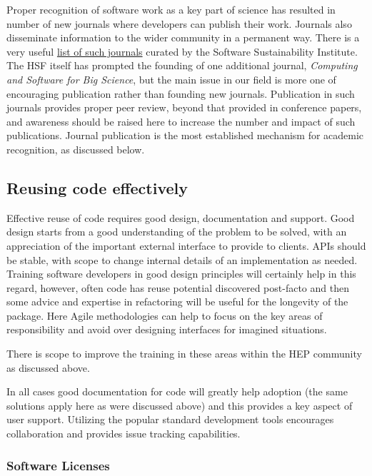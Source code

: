 \documentclass[12pt,a4paper]{article}
\begin{document}
Proper recognition of software work as a key part of science has
resulted in number of new journals where developers can publish their
work. Journals also disseminate information to the wider community in a
permanent way. There is a very useful
\href{https://www.software.ac.uk/which-journals-should-i-publish-my-software}{{list
of such journals}} curated by the Software Sustainability Institute. The
HSF itself has prompted the founding of one additional journal,
\emph{Computing and Software for Big Science}, but the main issue in our
field is more one of encouraging publication rather than founding new
journals. Publication in such journals provides proper peer review,
beyond that provided in conference papers, and awareness should be
raised here to increase the number and impact of such publications.
Journal publication is the most established mechanism for academic
recognition, as discussed below.

\hypertarget{reusing-code-effectively}{%
\subsection{Reusing code effectively}\label{reusing-code-effectively}}

Effective reuse of code requires good design, documentation and support.
Good design starts from a good understanding of the problem to be
solved, with an appreciation of the important external interface to
provide to clients. APIs should be stable, with scope to change internal
details of an implementation as needed. Training software developers in
good design principles will certainly help in this regard, however,
often code has reuse potential discovered post-facto and then some
advice and expertise in refactoring will be useful for the longevity of
the package. Here Agile methodologies can help to focus on the key areas
of responsibility and avoid over designing interfaces for imagined
situations.

There is scope to improve the training in these areas within the HEP
community as discussed above.

In all cases good documentation for code will greatly help adoption (the
same solutions apply here as were discussed above) and this provides a
key aspect of user support. Utilizing the popular standard development
tools encourages collaboration and provides issue tracking capabilities.

\hypertarget{software-licenses}{%
\subsubsection{Software Licenses}\label{software-licenses}}
\end{document}
